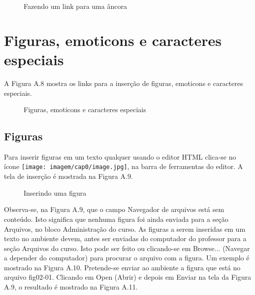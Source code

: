 \begin{figure}
 \begin{center}
  \caption{Fazendo um link para uma âncora}
 \end{center}
\end{figure}


\section{Figuras, emoticons e caracteres especiais}


A Figura A.8 mostra os links para a inserção de figuras, emoticons e caracteres especiais.

\begin{figure}
 \begin{center}
  \caption{Figuras, emoticons e caracteres especiais}
 \end{center}
\end{figure}

\subsection{Figuras}

Para inserir figuras em um texto qualquer usando o editor HTML clica-se no ícone 
\texttt{[image: imagem/cap0/image.jpg]}, na barra de ferramentas do editor. A tela de inserção é mostrada na Figura A.9.

\begin{figure}
 \begin{center}
  \caption{Inserindo uma figura}
 \end{center}
\end{figure}

Observa-se, na Figura A.9, que o campo Navegador de arquivos está sem conteúdo. Isto significa que nenhuma figura foi ainda enviada para a seção Arquivos, no bloco Administração do curso. As figuras a serem inseridas em um texto no ambiente devem, antes ser enviadas do computador do professor para a seção Arquivos do curso. Isto pode ser feito ou clicando-se em Browse... (Navegar a depender do computador) para procurar o arquivo com a figura. Um exemplo é mostrado na Figura A.10. Pretende-se enviar ao ambiente a figura que está no arquivo fig02-01. Clicando em Open (Abrir) e depois em Enviar na tela da Figura A.9, o resultado é mostrado na Figura A.11.

